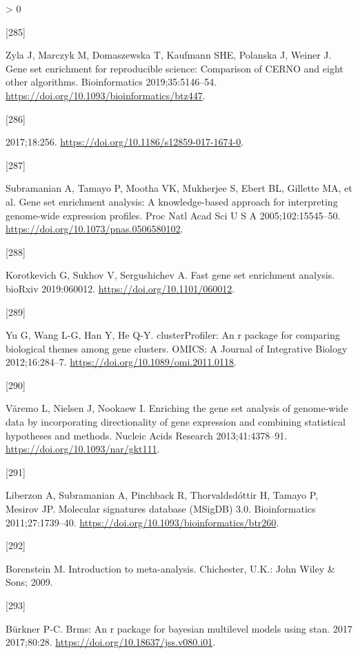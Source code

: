 \documentclass[twoside,10pt]{gihclass} %
\newlength{\cslhangindent}
\newlength{\csllabelwidth}
\newenvironment{CSLReferences}[3] %
 {%
  \setlength{\parindent}{0pt}
  \ifodd #1 \everypar{\setlength{\hangindent}{\cslhangindent}}\ignorespaces\fi
  \ifnum #2 > 0
  \setlength{\parskip}{#2\baselineskip}
  \fi
 }%
 {}
\newcommand{\CSLLeftMargin}[1]{\parbox[t]{\maxof{\widthof{#1}}{\csllabelwidth}}{#1}}
\newcommand{\CSLRightInline}[1]{\parbox[t]{\linewidth}{#1}}
\begin{document}
\begin{CSLReferences}{0}{0}
\leavevmode\hypertarget{ref-RN2438}{}%
\CSLLeftMargin{{[}285{]} }
\CSLRightInline{Zyla J, Marczyk M, Domaszewska T, Kaufmann SHE, Polanska J, Weiner J. Gene set enrichment for reproducible science: Comparison of CERNO and eight other algorithms. Bioinformatics 2019;35:5146--54. \url{https://doi.org/10.1093/bioinformatics/btz447}.}

\leavevmode\hypertarget{ref-RN2435}{}%
\CSLLeftMargin{{[}286{]} }
\CSLRightInline{2017;18:256. \url{https://doi.org/10.1186/s12859-017-1674-0}.}

\leavevmode\hypertarget{ref-RN2432}{}%
\CSLLeftMargin{{[}287{]} }
\CSLRightInline{Subramanian A, Tamayo P, Mootha VK, Mukherjee S, Ebert BL, Gillette MA, et al. Gene set enrichment analysis: A knowledge-based approach for interpreting genome-wide expression profiles. Proc Natl Acad Sci U S A 2005;102:15545--50. \url{https://doi.org/10.1073/pnas.0506580102}.}

\leavevmode\hypertarget{ref-RN2434}{}%
\CSLLeftMargin{{[}288{]} }
\CSLRightInline{Korotkevich G, Sukhov V, Sergushichev A. Fast gene set enrichment analysis. bioRxiv 2019:060012. \url{https://doi.org/10.1101/060012}.}

\leavevmode\hypertarget{ref-clusterProfiler}{}%
\CSLLeftMargin{{[}289{]} }
\CSLRightInline{Yu G, Wang L-G, Han Y, He Q-Y. clusterProfiler: An r package for comparing biological themes among gene clusters. OMICS: A Journal of Integrative Biology 2012;16:284--7. \url{https://doi.org/10.1089/omi.2011.0118}.}

\leavevmode\hypertarget{ref-RN2891}{}%
\CSLLeftMargin{{[}290{]} }
\CSLRightInline{Väremo L, Nielsen J, Nookaew I. Enriching the gene set analysis of genome-wide data by incorporating directionality of gene expression and combining statistical hypotheses and methods. Nucleic Acids Research 2013;41:4378--91. \url{https://doi.org/10.1093/nar/gkt111}.}

\leavevmode\hypertarget{ref-RN2436}{}%
\CSLLeftMargin{{[}291{]} }
\CSLRightInline{Liberzon A, Subramanian A, Pinchback R, Thorvaldsdóttir H, Tamayo P, Mesirov JP. Molecular signatures database (MSigDB) 3.0. Bioinformatics 2011;27:1739--40. \url{https://doi.org/10.1093/bioinformatics/btr260}.}

\leavevmode\hypertarget{ref-RN2888}{}%
\CSLLeftMargin{{[}292{]} }
\CSLRightInline{Borenstein M. Introduction to meta-analysis. Chichester, U.K.: John Wiley \& Sons; 2009.}

\leavevmode\hypertarget{ref-RN2562}{}%
\CSLLeftMargin{{[}293{]} }
\CSLRightInline{Bürkner P-C. Brms: An r package for bayesian multilevel models using stan. 2017 2017;80:28. \url{https://doi.org/10.18637/jss.v080.i01}.}


\end{CSLReferences}
\end{document}

